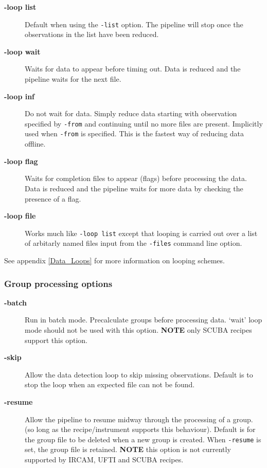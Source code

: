 \documentclass[twoside,11pt]{article}
\renewcommand{\_}{\texttt{\symbol{95}}}
\begin{document}
\begin{description}
\item[\textbf{-loop list}] \mbox{}

Default when using the \texttt{-list} option. The pipeline will stop
once the observations in the list have been reduced.

\item[\textbf{-loop wait}] \mbox{}

Waits for data to appear before timing out. Data is reduced and the pipeline
waits for the next file.

\item[\textbf{-loop inf}] \mbox{}

Do not wait for data. Simply reduce data starting with observation
specified by \texttt{-from} and continuing until no more files are present.
Implicitly used when \texttt{-from} is specified. This is the fastest way
of reducing data offline.

\item[\textbf{-loop flag}] \mbox{}

Waits for completion files to appear (flags) before processing the data.
Data is reduced and the pipeline waits for more data by checking the
presence of a flag.

\item[\textbf{-loop file}] \mbox{}

Works much like \texttt{-loop list} except that looping is carried out over a
list of arbitarly named files input from the \texttt{-files} command line option.

\end{description}


See appendix \ref{Data_Loops} for more information on looping schemes.

\subsubsection*{Group processing options\label{oracdr_Group_processing_options}}
\begin{description}
\item[\textbf{-batch}] \mbox{}

Run in batch mode. Precalculate groups before processing
data. `wait' loop mode should not be used with this option.
\textbf{NOTE} only SCUBA recipes support this option.

\item[\textbf{-skip}] \mbox{}

Allow the data detection loop to skip missing observations.
Default is to stop the loop when an expected file can not be found.

\item[\textbf{-resume}] \mbox{}

Allow the pipeline to resume midway through the processing
of a group. (so long as the recipe/instrument supports
this behaviour). Default is for the group file to be deleted
when a new group is created. When \texttt{-resume} is set, the group
file is retained. \textbf{NOTE} this option is not currently supported by
IRCAM, UFTI and SCUBA recipes.

\end{description}
\end{document}
